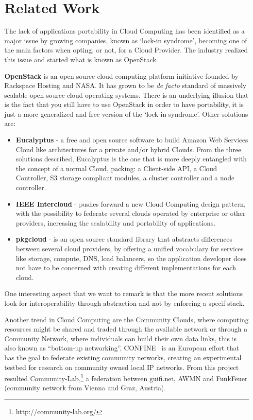 
\section{Related Work}

The lack of applications portability in Cloud Computing has been identified as a major issue by growing companies, known as `lock-in syndrome', becoming one of the main factors when opting, or not, for a Cloud Provider. The industry realized this issue and started what is known as OpenStack.

\textbf{OpenStack} is an open source cloud computing platform initiative founded by Rackspace Hosting and NASA. It has grown to be \textit{de facto} standard of massively scalable open source cloud operating systems. There is an underlying illusion that is the fact that you still have to use OpenStack in order to have portability, it is just a more generalized and free version of the `lock-in syndrome'. Other solutions are:
\begin{itemize}
  \item \textbf{Eucalyptus} - a free and open source software to build Amazon Web Services Cloud like architectures for a private and/or hybrid Clouds. From the three solutions described, Eucalyptus is the one that is more deeply entangled with the concept of a normal Cloud, packing: a Client-side API, a Cloud Controller, S3 storage compliant modules, a cluster controller and a node controller.
  \item \textbf{IEEE Intercloud} - pushes forward a new Cloud Computing design pattern, with the possibility to federate several clouds operated by enterprise or other providers, increasing the scalability and portability of applications.
  \item \textbf{pkgcloud} - is an open source standard library that abstracts differences between several cloud providers, by offering a unified vocabulary for services like storage, compute, DNS, load balancers, so the application developer does not have to be concerned with creating different implementations for each cloud.
\end{itemize}

One interesting aspect that we want to remark is that the more recent solutions look for interoperability through abstraction and not by enforcing a specif stack.

Another trend in Cloud Computing are the Community Clouds, where computing resources might be shared and traded through the available network or through a Community Network, where individuals can build their own data links, this is also known as ``bottom-up networking''. CONFINE~\cite{Navarro} is an European effort that has the goal to federate existing community networks, creating an experimental testbed for research on community owned local IP networks. From this project resulted Community-Lab,\footnote{http://community-lab.org/} a federation between guifi.net, AWMN and FunkFeuer (community network from Vienna and Graz, Austria).

